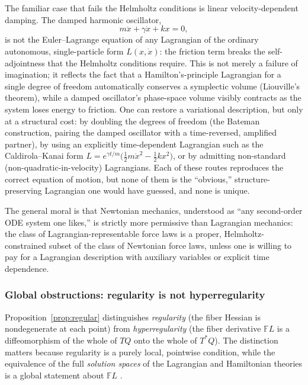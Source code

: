 The familiar case that fails the Helmholtz conditions is linear
velocity-dependent damping. The damped harmonic oscillator,
\begin{equation}
m\ddot x + \gamma \dot x + k x = 0 ,
\end{equation}
is not the Euler--Lagrange equation of any Lagrangian of the ordinary
autonomous, single-particle form $L(x,\dot x)$: the friction term breaks the
self-adjointness that the Helmholtz conditions require. This is not merely a
failure of imagination; it reflects the fact that a Hamilton's-principle
Lagrangian for a single degree of freedom automatically conserves a symplectic
volume (Liouville's theorem), while a damped oscillator's phase-space volume
visibly contracts as the system loses energy to friction. One can restore a
variational description, but only at a structural cost: by doubling the degrees
of freedom (the Bateman construction, pairing the damped oscillator with a
time-reversed, amplified partner), by using an explicitly time-dependent
Lagrangian such as the Caldirola--Kanai form $L = e^{\gamma t/m}\big(\tfrac12
m\dot x^2 - \tfrac12 kx^2\big)$, or by admitting non-standard
(non-quadratic-in-velocity) Lagrangians. Each of these routes reproduces the
correct equation of motion, but none of them is the ``obvious,''
structure-preserving Lagrangian one would have guessed, and none is unique.

The general moral is that Newtonian mechanics, understood as ``any second-order
ODE system one likes,'' is strictly more permissive than Lagrangian mechanics:
the class of Lagrangian-representable force laws is a proper,
Helmholtz-constrained subset of the class of Newtonian force laws, unless one
is willing to pay for a Lagrangian description with auxiliary variables or
explicit time dependence.

\subsubsection{Global obstructions: regularity is not hyperregularity}
\label{global}

Proposition~\ref{prop:regular} distinguishes \emph{regularity} (the fiber
Hessian is nondegenerate at each point) from \emph{hyperregularity} (the fiber
derivative $\mathbb{F}L$ is a diffeomorphism of the whole of $TQ$ onto the
whole of $T^*Q$). The distinction matters because regularity is a purely local,
pointwise condition, while the equivalence of the full \emph{solution spaces}
of the Lagrangian and Hamiltonian theories is a global statement about
$\mathbb{F}L$ \cite{abrahammarsden}.

